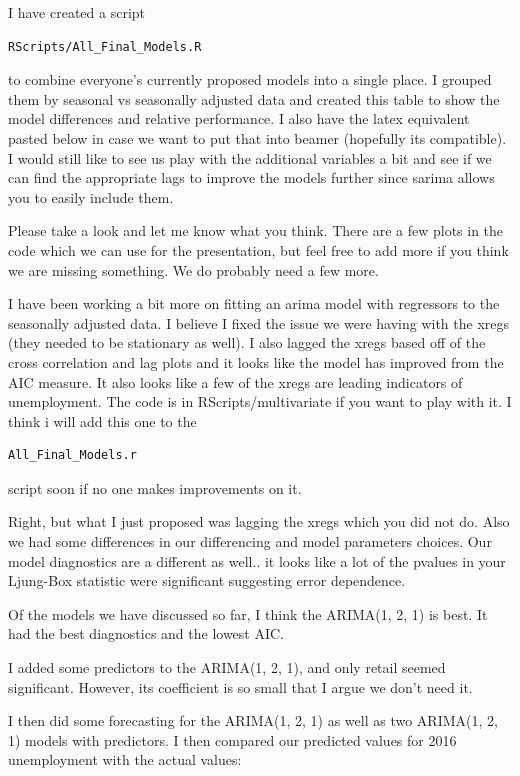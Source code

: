 \documentclass[twoside,twocolumn]{article}
\begin{document}
I have created a script \begin{verbatim}RScripts/All_Final_Models.R\end{verbatim} to combine everyone's currently proposed models into a single place. I grouped them by seasonal vs seasonally adjusted data and created this table to show the model differences and relative performance. I also have the latex equivalent pasted below in case we want to put that into beamer (hopefully its compatible). I would still like to see us play with the additional variables a bit and see if we can find the appropriate lags to improve the models further since sarima allows you to easily include them.

Please take a look and let me know what you think. There are a few plots in the code which we can use for the presentation, but feel free to add more if you think we are missing something. We do probably need a few more.

I have been working a bit more on fitting an arima model with regressors to the seasonally adjusted data. I believe I fixed the issue we were having with the xregs (they needed to be stationary as well). I also lagged the xregs based off of the cross correlation and lag plots and it looks like the model has improved from the AIC measure. It also looks like a few of the xregs are leading indicators of unemployment. The code is in RScripts/multivariate if you want to play with it. I think i will add this one to the \begin{verbatim}All_Final_Models.r\end{verbatim} script soon if no one makes improvements on it. 

Right, but what I just proposed was lagging the xregs which you did not do. Also we had some differences in our differencing and model parameters choices. Our model diagnostics are a different as well.. it looks like a lot of the pvalues in your Ljung-Box statistic were significant suggesting error dependence.

Of the models we have discussed so far, I think the ARIMA(1, 2, 1) is best. It had the best diagnostics and the lowest AIC.

I added some predictors to the ARIMA(1, 2, 1), and only retail seemed significant. However, its coefficient is so small that I argue we don't need it.

I then did some forecasting for the ARIMA(1, 2, 1) as well as two ARIMA(1, 2, 1) models with predictors. I then compared our predicted values for 2016 unemployment with the actual values:
\end{document}

